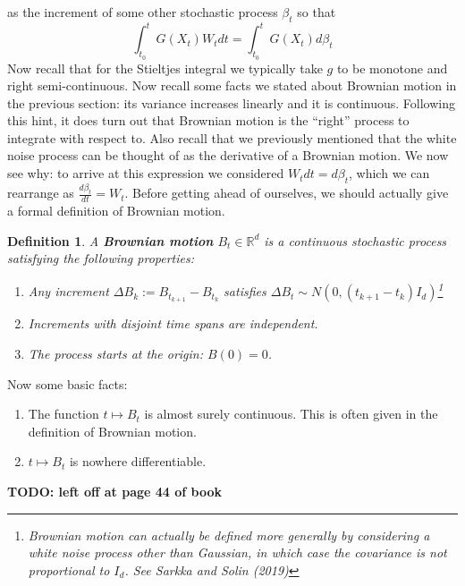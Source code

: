 \documentclass[12pt]{article}
\newcommand{\R}{\mathcal{R}}
\def\R{\mathbb{R}}
\newtheorem{definition}{Definition}
\begin{document}
as the increment of some other stochastic process $\beta_t$ so that 
\[\int_{t_0}^{t} G(X_t) W_t dt = \int_{t_0}^{t} G(X_t) d\beta_t \]
Now recall that for the Stieltjes integral we typically take $g$ to be monotone and right semi-continuous. Now recall some facts we stated about Brownian motion in 
the previous section: its variance increases linearly and it is continuous. Following this hint, it does turn out that Brownian motion is the ``right'' process to integrate with 
respect to. Also recall that we previously mentioned that the white noise process can be thought of as the derivative of a Brownian motion. We now see why: 
to arrive at this expression we considered $W_t dt = d\beta_t$, which we can rearrange as $\frac{d\beta_t}{dt} = W_t$. 
Before getting ahead of ourselves, we should actually give a formal definition of Brownian motion. 
\begin{definition}
A \textbf{Brownian motion} $B_t \in \R^d$ is a continuous stochastic process satisfying the following properties: 
\begin{enumerate} 
\item Any increment $\Delta B_k := B_{t_{k + 1}} - B_{t_k}$ satisfies $\Delta B_t \sim N(0, (t_{k + 1} - t_{k})I_d)$\footnote{Brownian motion can actually be defined more generally 
by considering a white noise process other than Gaussian, in which case the covariance is not proportional to $I_d$. See Sarkka and Solin (2019)}
\item Increments with disjoint time spans are independent. 
\item The process starts at the origin: $B(0) = 0$. 
\end{enumerate}
\end{definition}

Now some basic facts: 
\begin{enumerate}
\item The function $t \mapsto B_t$ is almost surely continuous. This is often given in the definition of Brownian motion. 
\item $t \mapsto B_t$ is nowhere differentiable.  
\end{enumerate}

\textbf{TODO: left off at page 44 of book}
\end{document}
